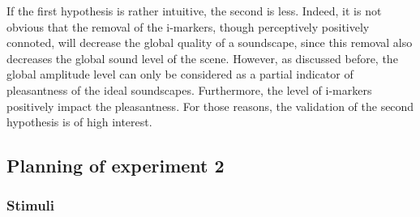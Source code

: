 \documentclass[12pt]{elsarticle}
\begin{document}


If the first hypothesis is rather intuitive, the second is less. Indeed, it is not obvious that the removal of the i-markers, though perceptively positively connoted, will decrease the global quality of a soundscape, since this removal also decreases the global sound level of the scene. However, as discussed before, the global amplitude level can only be considered as a partial indicator of pleasantness of the ideal soundscapes. Furthermore, the level of i-markers positively impact the pleasantness. For those reasons, the validation of the second hypothesis is of high interest.

\subsection{Planning of experiment 2}

\subsubsection*{Stimuli}

\end{document}

